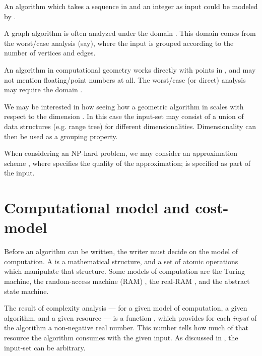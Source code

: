 \documentclass[b5paper, english, oneside]{memoir}
\begin{document}
\begin{example}
An algorithm which takes a sequence in  and an integer as input could be modeled by .
\end{example}

\begin{example}
A graph algorithm is often analyzed under the domain . This domain comes from the worst\-/case analysis (say), where the input is grouped according to the number of vertices and edges.
\end{example}

\begin{example}
An algorithm in computational geometry \cite{CGeometry} works directly with points in , and may not mention floating\-/point numbers at all. The worst\-/case (or direct) analysis may require the domain .
\end{example}

\begin{example}
We may be interested in how seeing how a geometric algorithm in  scales with respect to the dimension . In this case the input-set may consist of a union of data structures (e.g. range tree) for different dimensionalities. Dimensionality can then be used as a grouping property.
\end{example}

\begin{example}
When considering an NP-hard problem, we may consider an approximation scheme \cite{IntroAlgo2009}, where  specifies the quality of the approximation;  is specified as part of the input.
\end{example}

\section{Computational model and cost-model}
\label{Cost models}

Before an algorithm can be written, the writer must decide on the model of computation. A  is a mathematical structure, and a set of atomic operations which manipulate that structure. Some models of computation are the Turing machine, the random-access machine (RAM) \cite{RamModel}, the real-RAM \cite{RealRam}, and the abstract state machine.

The result of complexity analysis --- for a given model of computation, a given algorithm, and a given resource --- is a function , which provides for each \emph{input} of the algorithm a non-negative real number. This number tells how much of that resource the algorithm consumes with the given input. As discussed in , the input-set  can be arbitrary.
\end{document}
